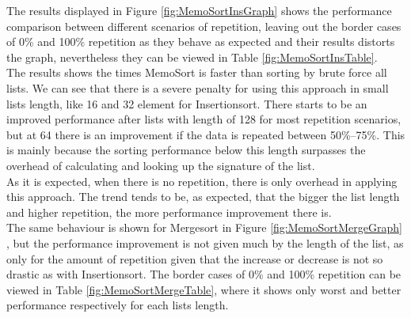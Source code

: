 \documentclass[a4paper,12pt]{article}
\begin{document}
The results displayed in Figure \ref{fig:MemoSortInsGraph} shows the performance comparison between different scenarios of repetition, leaving out the border cases of 0\% and 100\% repetition as they behave as expected and their results distorts the graph, nevertheless they can be viewed in Table \ref{fig:MemoSortInsTable}. \\

The results shows the times MemoSort is faster than sorting by brute force all lists. We can see that there is a severe penalty for using this approach in small lists length, like 16 and 32 element for Insertionsort. There starts to be an improved performance after lists with length of 128 for most repetition scenarios, but at 64 there is an improvement if the data is repeated between 50\%--75\%. This is  mainly because the sorting performance below this length surpasses the overhead of calculating and looking up the signature of the list. \\
As it is expected, when there is no repetition, there is only overhead in applying this approach. The trend tends to be, as expected, that the bigger the list length and higher repetition, the more performance improvement there is.\\

The same behaviour is shown for Mergesort in Figure  \ref{fig:MemoSortMergeGraph} , but the performance improvement is not given much by the length of the list, as only for the amount of repetition given that the increase or decrease is not so drastic as with Insertionsort. The border cases of 0\% and 100\% repetition can be viewed in Table \ref{fig:MemoSortMergeTable}, where it shows only worst and better performance respectively for each lists length.
\end{document}
